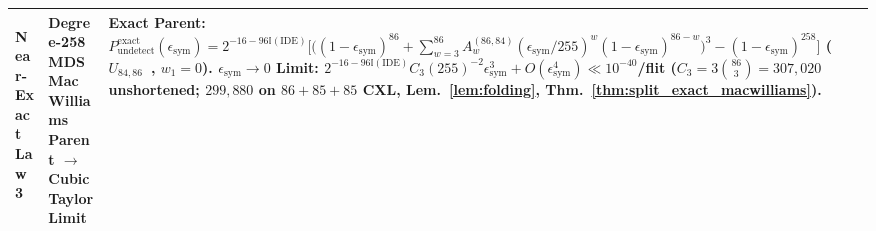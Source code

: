 \documentclass[11pt,letterpaper]{article}
\theoremstyle{spectralthm}
\begin{document}
\begin{table}[!htp]
{\begin{minipage}{1.14\textwidth}
\begin{tabularx}{\textwidth}{@{}>{\bfseries\raggedright\arraybackslash}p{2.05cm} >{\raggedright\arraybackslash}p{3.40cm} >{\raggedright\arraybackslash}X@{}}
\addlinespace[1.2pt]
Near-Exact Law 3 & Degree-258 MDS MacWilliams Parent $\to$ Cubic Taylor Limit & \textbf{Exact Parent:} $P_{\mathrm{undetect}}^{\mathrm{exact}}(\epsilon_{\mathrm{sym}})=2^{-16-96\mathbb{I}(\mathrm{IDE})}\bigl[\bigl((1-\epsilon_{\mathrm{sym}})^{86}+\sum_{w=3}^{86}A_w^{(86,84)}(\epsilon_{\mathrm{sym}}/255)^w(1-\epsilon_{\mathrm{sym}})^{86-w}\bigr)^3-(1-\epsilon_{\mathrm{sym}})^{258}\bigr]$ ($U_{84,86}$~\cite{greene1976weight}, $w_1=0$). \textbf{$\epsilon_{\mathrm{sym}}\to 0$ Limit:} $2^{-16-96\mathbb{I}(\mathrm{IDE})}C_3(255)^{-2}\epsilon_{\mathrm{sym}}^3+O(\epsilon_{\mathrm{sym}}^4)\ll 10^{-40}$/flit ($C_3=3\binom{86}{3}=307{,}020$ unshortened; $299{,}880$ on $86\!+\!85\!+\!85$ CXL, Lem.~\ref{lem:folding}, Thm.~\ref{thm:split_exact_macwilliams}). \\
\bottomrule
\end{tabularx}
  \end{minipage}%
}
\endgroup
\end{table}

\clearpage
\end{document}
